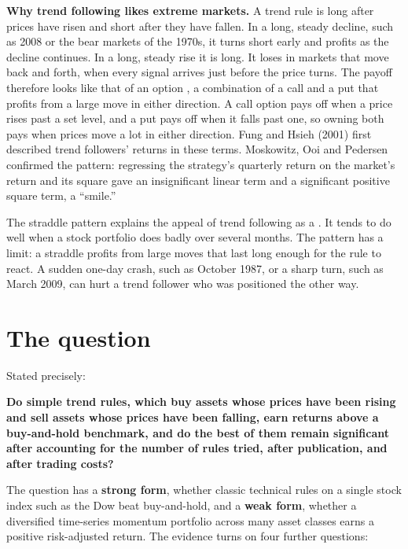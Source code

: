 \textbf{Why trend following likes extreme markets.} A trend rule is long after prices have risen and short after they have fallen. In a long, steady decline, such as 2008 or the bear markets of the 1970s, it turns short early and profits as the decline continues. In a long, steady rise it is long. It loses in markets that move back and forth, when every signal arrives just before the price turns. The payoff therefore looks like that of an option , a combination of a call and a put that profits from a large move in either direction. A call option pays off when a price rises past a set level, and a put pays off when it falls past one, so owning both pays when prices move a lot in either direction. Fung and Hsieh (2001) first described trend followers' returns in these terms. Moskowitz, Ooi and Pedersen confirmed the pattern: regressing the strategy's quarterly return on the market's return and its square gave an insignificant linear term and a significant positive square term, a ``smile.''

The straddle pattern explains the appeal of trend following as a . It tends to do well when a stock portfolio does badly over several months. The pattern has a limit: a straddle profits from large moves that last long enough for the rule to react. A sudden one-day crash, such as October 1987, or a sharp turn, such as March 2009, can hurt a trend follower who was positioned the other way.


\section{The question}
\label{sec:08-claim}

Stated precisely:

\begin{callout}
\textbf{Do simple trend rules, which buy assets whose prices have been rising and sell assets whose prices have been falling, earn returns above a buy-and-hold benchmark, and do the best of them remain significant after accounting for the number of rules tried, after publication, and after trading costs?}
\end{callout}

The question has a \textbf{strong form}, whether classic technical rules on a single stock index such as the Dow beat buy-and-hold, and a \textbf{weak form}, whether a diversified time-series momentum portfolio across many asset classes earns a positive risk-adjusted return. The evidence turns on four further questions:

